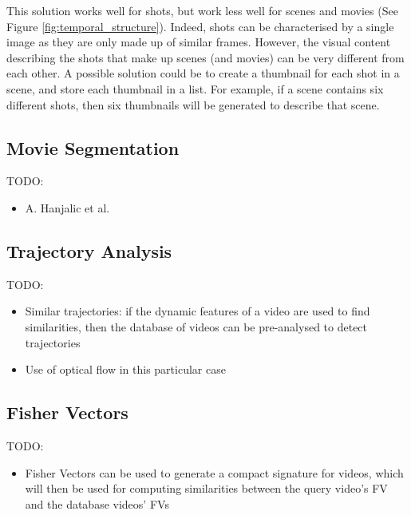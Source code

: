 This solution works well for shots, but work less well for scenes and movies (See Figure \ref{fig:temporal_structure}). Indeed, shots can be characterised by a single image as they are only made up of similar frames. However, the visual content describing the shots that make up scenes (and movies) can be very different from each other. A possible solution could be to create a thumbnail for each shot in a scene, and store each thumbnail in a list. For example, if a scene contains six different shots, then six thumbnails will be generated to describe that scene.\\

\subsection{Movie Segmentation}

TODO:
\begin{itemize}
    \item A. Hanjalic et al. \cite{hanjalic1999moviesegmentation}
\end{itemize}


\subsection{Trajectory Analysis}

TODO:
\begin{itemize}
    \item Similar trajectories: if the dynamic features of a video are used to find similarities, then the database of videos can be pre-analysed to detect trajectories \cite{lai2015trajectory}
    \item Use of optical flow in this particular case
\end{itemize}


\subsection{Fisher Vectors}

TODO:
\begin{itemize}
    \item Fisher Vectors can be used to generate a compact signature for videos, which will then be used for computing similarities between the query video's FV and the database videos' FVs \cite{araujo2017i2v}
\end{itemize}